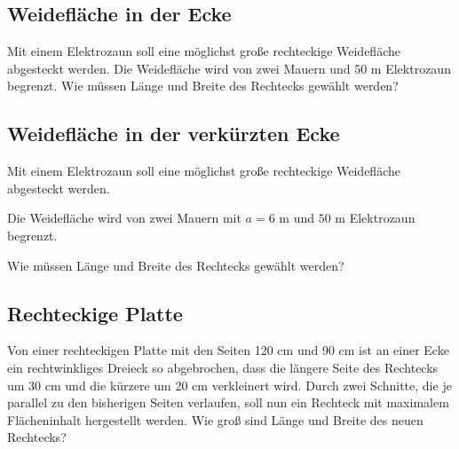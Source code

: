 
\subsection{Weidefläche in der Ecke}

Mit einem Elektrozaun soll eine möglichst große rechteckige
Weidefläche abgesteckt werden.
Die Weidefläche wird von zwei Mauern und 50 m
Elektrozaun begrenzt.
Wie
müssen Länge und Breite des Rechtecks gewählt werden?


\subsection{Weidefläche in der verkürzten Ecke}

Mit einem Elektrozaun soll eine möglichst große rechteckige
Weidefläche abgesteckt werden.

Die Weidefläche wird von zwei Mauern
mit $a=6 \text{ m}$ und $50 \text{ m}$
Elektrozaun begrenzt.

Wie müssen Länge und Breite des Rechtecks gewählt werden?


\subsection{Rechteckige Platte}
Von einer rechteckigen Platte mit den Seiten 120 cm und 90 cm ist an
einer Ecke ein rechtwinkliges Dreieck so abgebrochen, dass die längere
Seite des Rechtecks um 30 cm und die kürzere um 20 cm verkleinert
wird. Durch zwei Schnitte, die je parallel zu den bisherigen Seiten
verlaufen, soll nun ein Rechteck mit maximalem Flächeninhalt hergestellt werden.
Wie groß sind Länge und Breite des neuen Rechtecks?

